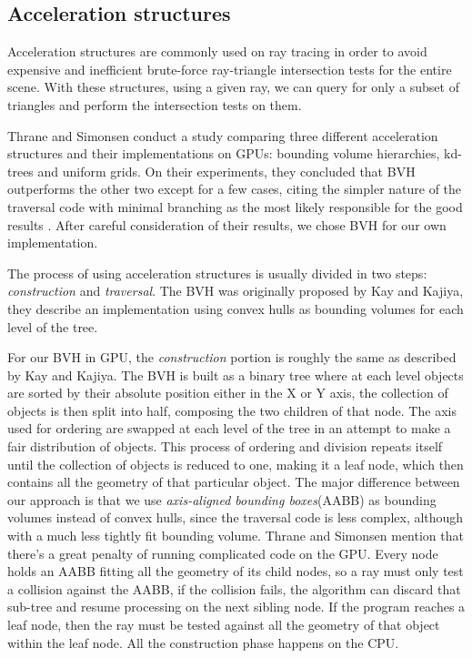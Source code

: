 \documentclass{vgtc}
\begin{document}
\subsection{Acceleration structures}

Acceleration structures are commonly used on ray tracing in order to
avoid expensive and inefficient brute-force ray-triangle intersection
tests for the entire scene. With these structures, using a given ray,
we can query for only a subset of triangles and perform the
intersection tests on them.

Thrane and Simonsen conduct a study comparing three different
acceleration structures and their implementations on GPUs: bounding
volume hierarchies, kd-trees and uniform grids. On their experiments,
they concluded that BVH outperforms the other two except for a few
cases, citing the simpler nature of the traversal code with minimal
branching as the most likely responsible for the good results
\cite{Thrane}. After careful consideration of their results, we chose
BVH for our own implementation.

The process of using acceleration structures is usually divided in two
steps: \emph{construction} and \emph{traversal}. The BVH was
originally proposed by Kay and Kajiya\cite{kay1986ray}, they describe
an implementation using convex hulls as bounding volumes for each level
of the tree.

For our BVH in GPU, the \emph{construction} portion is roughly the
same as described by Kay and Kajiya. The BVH is built as a binary tree
where at each level objects are sorted by their absolute position
either in the X or Y axis, the collection of objects is then split into
half, composing the two children of that node. The axis used for
ordering are swapped at each level of the tree in an attempt to make a
fair distribution of objects. This process of ordering and division
repeats itself until the collection of objects is reduced to one, making it a
leaf node, which then contains all the geometry of that particular
object. The major difference between our approach is that we use
\emph{axis-aligned bounding boxes}(AABB) as bounding volumes instead of
convex hulls, since the traversal code is less complex, although with
a much less tightly fit bounding volume. Thrane and Simonsen mention
that there's a great penalty of running complicated code on the
GPU\cite{Thrane}. Every node holds an AABB fitting all the geometry of
its child nodes, so a ray must only test a collision against the AABB,
if the collision fails, the algorithm can discard that sub-tree and
resume processing on the next sibling node. If the program reaches a
leaf node, then the ray must be tested against all the geometry of
that object within the leaf node. All the construction phase happens
on the CPU.
\end{document}
